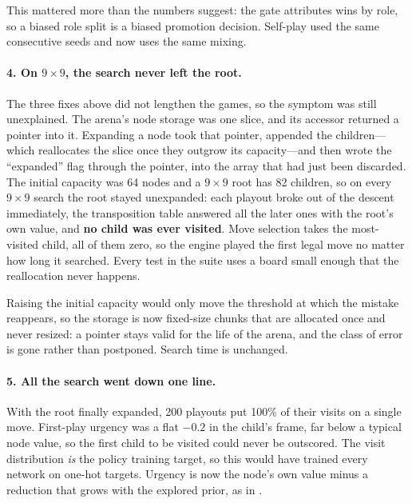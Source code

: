 This mattered more than the numbers suggest: the gate attributes wins by role, so
a biased role split is a biased promotion decision. Self-play used the same
consecutive seeds and now uses the same mixing.

\paragraph{4. On $9\times9$, the search never left the root.}
The three fixes above did not lengthen the games, so the symptom was still
unexplained. The arena's node storage was one slice, and its accessor returned a
pointer into it. Expanding a node took that pointer, appended the children---which
reallocates the slice once they outgrow its capacity---and then wrote the
``expanded'' flag through the pointer, into the array that had just been
discarded. The initial capacity was 64 nodes and a $9\times9$ root has 82
children, so on every $9\times9$ search the root stayed unexpanded: each playout
broke out of the descent immediately, the transposition table answered all the
later ones with the root's own value, and \textbf{no child was ever visited}.
Move selection takes the most-visited child, all of them zero, so the engine
played the first legal move no matter how long it searched. Every test in the
suite uses a board small enough that the reallocation never happens.

Raising the initial capacity would only move the threshold at which the mistake
reappears, so the storage is now fixed-size chunks that are allocated once and
never resized: a pointer stays valid for the life of the arena, and the class of
error is gone rather than postponed. Search time is unchanged.

\paragraph{5. All the search went down one line.}
With the root finally expanded, 200 playouts put 100\% of their visits on a
single move. First-play urgency was a flat $-0.2$ in the child's frame, far below
a typical node value, so the first child to be visited could never be outscored.
The visit distribution \emph{is} the policy training target, so this would have
trained every network on one-hot targets. Urgency is now the node's own value
minus a reduction that grows with the explored prior, as in
\citet{wu2019accelerating}.

